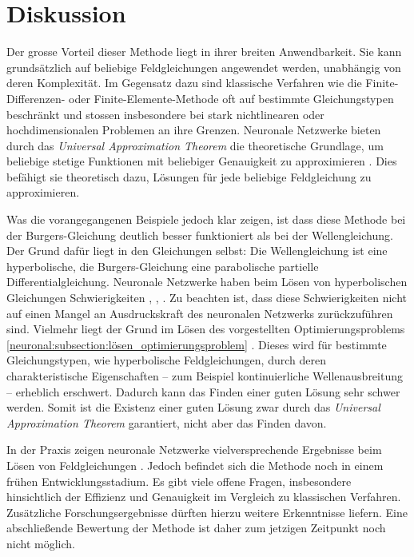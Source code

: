 %
%
%
%

\section{Diskussion}\label{neuronal:section:diskussion}

Der grosse Vorteil dieser Methode liegt in ihrer breiten Anwendbarkeit.
Sie kann grundsätzlich auf beliebige Feldgleichungen angewendet werden, unabhängig von deren Komplexität.
Im Gegensatz dazu sind klassische Verfahren wie die Finite-Differenzen- oder Finite-Elemente-Methode oft auf bestimmte Gleichungstypen beschränkt und stossen insbesondere bei stark nichtlinearen oder hochdimensionalen Problemen an ihre Grenzen.
Neuronale Netzwerke bieten durch das \emph{Universal Approximation Theorem} die theoretische Grundlage, um beliebige stetige Funktionen mit beliebiger Genauigkeit zu approximieren \cite{neuronal:universal_approximation_theorem}.
Dies befähigt sie theoretisch dazu, Lösungen für jede beliebige Feldgleichung zu approximieren.

Was die vorangegangenen Beispiele jedoch klar zeigen, ist dass diese Methode bei der Burgers-Gleichung deutlich besser funktioniert als bei der Wellengleichung.
Der Grund dafür liegt in den Gleichungen selbst: 
Die Wellengleichung ist eine hyperbolische, die Burgers-Gleichung eine parabolische partielle Differentialgleichung.
Neuronale Netzwerke haben beim Lösen von hyperbolischen Gleichungen Schwierigkeiten \cite{neuronal:hyperbolisch_1}, \cite{neuronal:hyperbolisch_2}, \cite{neuronal:hyperbolisch_3}.
Zu beachten ist, dass diese Schwierigkeiten nicht auf einen Mangel an Ausdruckskraft des neuronalen Netzwerks zurückzuführen sind.
Vielmehr liegt der Grund im Lösen des vorgestellten Optimierungsproblems \ref{neuronal:subsection:lösen_optimierungsproblem} \cite{neuronal:hyperbolisch_4}.
Dieses wird für bestimmte Gleichungstypen, wie hyperbolische Feldgleichungen, durch deren charakteristische Eigenschaften -- zum Beispiel kontinuierliche Wellenausbreitung -- erheblich erschwert.
Dadurch kann das Finden einer guten Lösung sehr schwer werden.
Somit ist die Existenz einer guten Lösung zwar durch das \emph{Universal Approximation Theorem} garantiert, nicht aber das Finden davon.

In der Praxis zeigen neuronale Netzwerke vielversprechende Ergebnisse beim Lösen von Feldgleichungen \cite{neuronal:pinns}.
Jedoch befindet sich die Methode noch in einem frühen Entwicklungsstadium.
Es gibt viele offene Fragen, insbesondere hinsichtlich der Effizienz und Genauigkeit im Vergleich zu klassischen Verfahren.
Zusätzliche Forschungsergebnisse dürften hierzu weitere Erkenntnisse liefern.
Eine abschließende Bewertung der Methode ist daher zum jetzigen Zeitpunkt noch nicht möglich.
